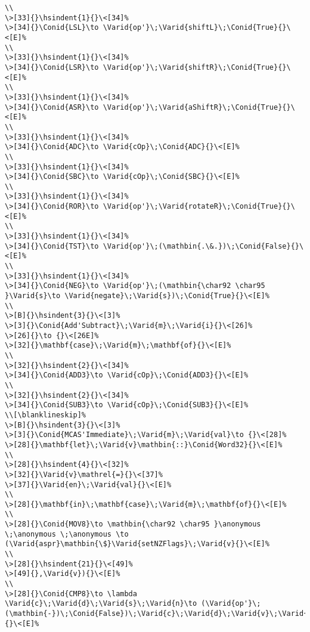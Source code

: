 \documentclass{article}
\makeatletter
\newcommand{\Conid}[1]{\mathit{#1}}
\newcommand{\Varid}[1]{\mathit{#1}}
\newcommand{\anonymous}{\kern0.06em \vbox{\hrule\@width.5em}}
\newlength{\blanklineskip}
\newcommand{\hsindent}[1]{\quad}%
\makeatother
\begin{document}
\begin{Verbatim}[fontsize=\scriptsize]
\\
\>[33]{}\hsindent{1}{}\<[34]%
\>[34]{}\Conid{LSL}\to \Varid{op'}\;\Varid{shiftL}\;\Conid{True}{}\<[E]%
\\
\>[33]{}\hsindent{1}{}\<[34]%
\>[34]{}\Conid{LSR}\to \Varid{op'}\;\Varid{shiftR}\;\Conid{True}{}\<[E]%
\\
\>[33]{}\hsindent{1}{}\<[34]%
\>[34]{}\Conid{ASR}\to \Varid{op'}\;\Varid{aShiftR}\;\Conid{True}{}\<[E]%
\\
\>[33]{}\hsindent{1}{}\<[34]%
\>[34]{}\Conid{ADC}\to \Varid{cOp}\;\Conid{ADC}{}\<[E]%
\\
\>[33]{}\hsindent{1}{}\<[34]%
\>[34]{}\Conid{SBC}\to \Varid{cOp}\;\Conid{SBC}{}\<[E]%
\\
\>[33]{}\hsindent{1}{}\<[34]%
\>[34]{}\Conid{ROR}\to \Varid{op'}\;\Varid{rotateR}\;\Conid{True}{}\<[E]%
\\
\>[33]{}\hsindent{1}{}\<[34]%
\>[34]{}\Conid{TST}\to \Varid{op'}\;(\mathbin{.\&.})\;\Conid{False}{}\<[E]%
\\
\>[33]{}\hsindent{1}{}\<[34]%
\>[34]{}\Conid{NEG}\to \Varid{op'}\;(\mathbin{\char92 \char95 }\Varid{s}\to \Varid{negate}\;\Varid{s})\;\Conid{True}{}\<[E]%
\\
\>[B]{}\hsindent{3}{}\<[3]%
\>[3]{}\Conid{Add'Subtract}\;\Varid{m}\;\Varid{i}{}\<[26]%
\>[26]{}\to {}\<[26E]%
\>[32]{}\mathbf{case}\;\Varid{m}\;\mathbf{of}{}\<[E]%
\\
\>[32]{}\hsindent{2}{}\<[34]%
\>[34]{}\Conid{ADD3}\to \Varid{cOp}\;\Conid{ADD3}{}\<[E]%
\\
\>[32]{}\hsindent{2}{}\<[34]%
\>[34]{}\Conid{SUB3}\to \Varid{cOp}\;\Conid{SUB3}{}\<[E]%
\\[\blanklineskip]%
\>[B]{}\hsindent{3}{}\<[3]%
\>[3]{}\Conid{MCAS'Immediate}\;\Varid{m}\;\Varid{val}\to {}\<[28]%
\>[28]{}\mathbf{let}\;\Varid{v}\mathbin{::}\Conid{Word32}{}\<[E]%
\\
\>[28]{}\hsindent{4}{}\<[32]%
\>[32]{}\Varid{v}\mathrel{=}{}\<[37]%
\>[37]{}\Varid{en}\;\Varid{val}{}\<[E]%
\\
\>[28]{}\mathbf{in}\;\mathbf{case}\;\Varid{m}\;\mathbf{of}{}\<[E]%
\\
\>[28]{}\Conid{MOV8}\to \mathbin{\char92 \char95 }\anonymous \;\anonymous \;\anonymous \to (\Varid{aspr}\mathbin{\$}\Varid{setNZFlags}\;\Varid{v}{}\<[E]%
\\
\>[28]{}\hsindent{21}{}\<[49]%
\>[49]{},\Varid{v}){}\<[E]%
\\
\>[28]{}\Conid{CMP8}\to \lambda \Varid{c}\;\Varid{d}\;\Varid{s}\;\Varid{n}\to (\Varid{op'}\;(\mathbin{-})\;\Conid{False})\;\Varid{c}\;\Varid{d}\;\Varid{v}\;\Varid{d}{}\<[E]%

\end{Verbatim}
\end{document}
